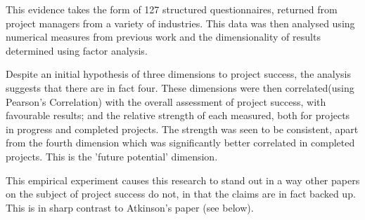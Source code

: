 This evidence takes the form of 127 structured questionnaires, returned from project managers from a variety of industries. This data was then analysed using numerical measures from previous work and the dimensionality of results determined using factor analysis.

Despite an initial hypothesis of three dimensions to project success, the analysis suggests that there are in fact four. These dimensions were then correlated(using Pearson's Correlation) with the overall assessment of project success, with favourable results; and the relative strength of each measured, both for projects in progress and completed projects. The strength was seen to be consistent, apart from the fourth dimension which was significantly better correlated in completed projects. This is the 'future potential' dimension. 

This empirical experiment causes this research to stand out in a way other papers on the subject of project success do not, in that the claims are in fact backed up. This is in sharp contrast to Atkinson's paper (see below).

